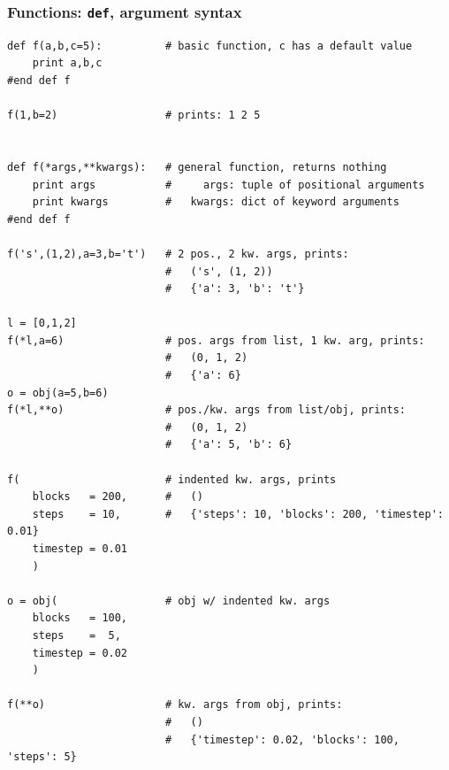 {\subsubsection{Functions: \texttt{def}, argument syntax}
\begin{shaded}
\begin{verbatim}
def f(a,b,c=5):          # basic function, c has a default value
    print a,b,c
#end def f

f(1,b=2)                 # prints: 1 2 5


def f(*args,**kwargs):   # general function, returns nothing
    print args           #     args: tuple of positional arguments
    print kwargs         #   kwargs: dict of keyword arguments
#end def f

f('s',(1,2),a=3,b='t')   # 2 pos., 2 kw. args, prints:
                         #   ('s', (1, 2))
                         #   {'a': 3, 'b': 't'}

l = [0,1,2]
f(*l,a=6)                # pos. args from list, 1 kw. arg, prints:
                         #   (0, 1, 2)
                         #   {'a': 6}
o = obj(a=5,b=6)
f(*l,**o)                # pos./kw. args from list/obj, prints:
                         #   (0, 1, 2)
                         #   {'a': 5, 'b': 6}

f(                       # indented kw. args, prints
    blocks   = 200,      #   () 
    steps    = 10,       #   {'steps': 10, 'blocks': 200, 'timestep': 0.01}
    timestep = 0.01
    )

o = obj(                 # obj w/ indented kw. args
    blocks   = 100,
    steps    =  5,
    timestep = 0.02
    )

f(**o)                   # kw. args from obj, prints:
                         #   ()
                         #   {'timestep': 0.02, 'blocks': 100, 'steps': 5}
\end{verbatim}
\end{shaded}
}
